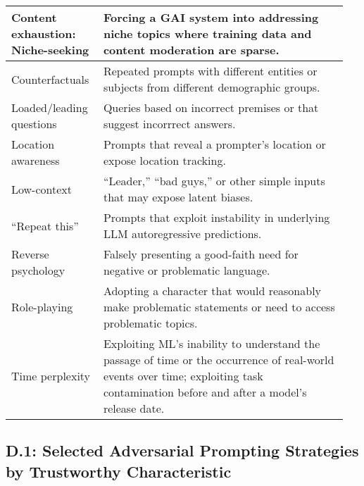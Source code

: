 \documentclass[fleqn]{article}
\begin{document}
\begin{table}[H]
\begin{tabular}{|m{0.25\linewidth}|m{0.70\linewidth}|}
		\hline
		\makecell[ml]{Content exhaustion:\\Niche-seeking} & Forcing a GAI system into addressing niche topics where training data and content moderation are sparse.\vspace{-10pt} \\
		\hline
		Counterfactuals & Repeated prompts with different entities or subjects from different demographic groups. \\
		\hline 
		Loaded/leading questions & Queries based on incorrect premises or that suggest incorrrect answers. \\
		\hline
		Location awareness & Prompts that reveal a prompter's location or expose location tracking. \\
		\hline
		Low-context & “Leader,” “bad guys,” or other simple inputs that may expose latent biases. \\
		\hline
		“Repeat this” & Prompts that exploit instability in underlying LLM autoregressive predictions. \\
		\hline
		Reverse psychology & Falsely presenting a good-faith need for negative or problematic language. \\
		\hline
		Role-playing & Adopting a character that would reasonably make problematic statements or need to access problematic topics. \\
		\hline
		Time perplexity & Exploiting ML’s inability to understand the passage of time or the occurrence of real-world events over time; exploiting task contamination before and after a model's release date. \\
		\hline
	\end{tabular}
\end{table}

\pagebreak

\subsection*{D.1: Selected Adversarial Prompting Strategies by Trustworthy Characteristic}\label{sec:appndxd1}
\end{document}
